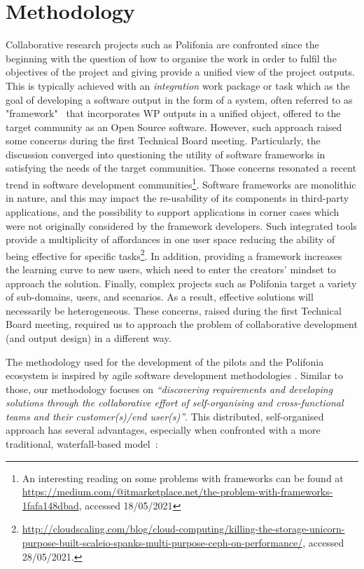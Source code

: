 \chapter{Methodology}\label{ch:methodology}
Collaborative research projects such as Polifonia are confronted since the beginning with the question of how to organise the work in order to fulfil the objectives of the project and giving provide a unified view of the project outputs.
This is typically achieved with an \textit{integration} work package or task which as the goal of developing a software output in the form of a system, often referred to as "framework"~\cite{johnson1997frameworks} that incorporates WP outputs in a unified object, offered to the target community as an Open Source software.
However, such approach raised some concerns during the first Technical Board meeting. 
Particularly, the discussion converged into questioning the utility of software frameworks in satisfying the needs of the target communities.
Those concerns resonated a recent trend in software development communities\footnote{An interesting reading on some problems with frameworks can be found at \url{https://medium.com/@itmarketplace.net/the-problem-with-frameworks-1fafa148dbad}, accessed 18/05/2021}. 
Software frameworks are monolithic in nature, and this may impact the re-usability of its components in third-party applications, and the possibility to support applications in corner cases which were not originally considered by the framework developers. 
Such integrated tools provide a multiplicity of affordances in one user space reducing the ability of being effective for specific tasks\footnote{\url{http://cloudscaling.com/blog/cloud-computing/killing-the-storage-unicorn-purpose-built-scaleio-spanks-multi-purpose-ceph-on-performance/}, accessed 28/05/2021.}.
In addition, providing a framework increases the learning curve to new users, which need to enter the creators' mindset to approach the solution.
Finally, complex projects such as Polifonia target a variety of sub-domains, users, and scenarios. 
As a result, effective solutions will necessarily be heterogeneous.
These concerns, raised during the first Technical Board meeting, required us to approach the problem of collaborative development (and output design) in a different way.

The methodology used for the development of the pilots and the Polifonia ecosystem is inspired by agile software development methodologies \cite{collier2012agile}. 
Similar to those, our methodology focuses on \textit{``discovering requirements and developing solutions through the collaborative effort of self-organising and cross-functional teams and their customer(s)/end user(s)''}. 
This distributed, self-organised approach has several advantages, especially when confronted with a more traditional, waterfall-based model~\cite{benington1983production}:


